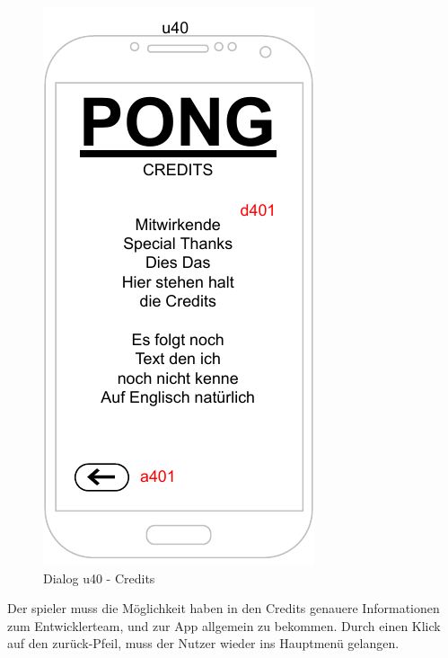 \begin{figure}
    \begin{center}
    \includegraphics{diagramme/pdf/Mockup-u40.pdf}
    \caption{Dialog u40 - Credits}
    \end{center}
\end{figure}

Der \gls{spieler} muss die Möglichkeit haben in den Credits genauere Informationen zum Entwicklerteam, und zur App allgemein zu bekommen.
Durch einen Klick auf den zurück-Pfeil, muss der Nutzer wieder ins Hauptmenü gelangen.
\clearpage
